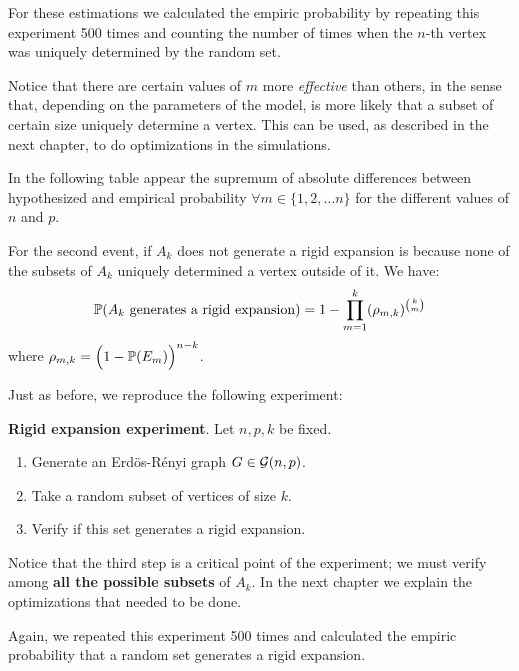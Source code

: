 For these estimations we calculated the empiric probability by repeating this experiment 500 times and counting the number of times when the $n$-th vertex was uniquely determined by the random set.

Notice that there are certain values of $m$ more \textit{effective} than others, in the sense that, depending on the parameters of the model, is more likely that a subset of certain size uniquely determine a vertex. This can be used, as described in the next chapter, to do optimizations in the simulations.

In the following table appear the supremum of absolute differences between hypothesized and empirical probability $\forall m \in \{1,2, \dots n\}$ for the different values of $n$ and $p$.

\vspace{0.3cm} 

\vspace{-0.3cm}

For the second event, if $A_k$ does not generate a rigid expansion is because none of the subsets of $A_{k}$ uniquely determined a vertex outside of it. We have:
$$\P(A_k \text{ generates a rigid expansion}) = 1 -  \prod_{m=1}^{k} (\rho_{m,k})^{\binom{k}{m}}$$
where $\rho_{m,k} = \Big(1 -  \P(E_m)\Big)^{n-k}$.

Just as before, we reproduce the following experiment:
 
\begin{cajita}
\textbf{Rigid expansion experiment}. Let $n,p,k$ be fixed.
\begin{enumerate}
\item Generate an Erdös-Rényi graph $G\in \G(n,p)$.
\item Take a random subset of vertices of size $k$.
\item Verify if this set generates a rigid expansion.
\end{enumerate}
\end{cajita}

Notice that the third step is a critical point of the experiment; we must verify among \textbf{all the possible subsets} of $A_{k}$. In the next chapter we explain the optimizations that needed to be done.

Again, we repeated this experiment 500 times and calculated the empiric probability that a random set generates a rigid expansion.

